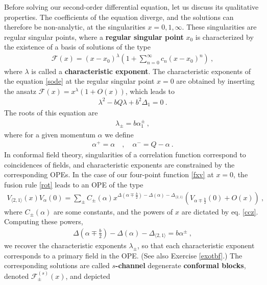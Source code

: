 \documentclass[12pt, a4paper, notitlepage, twoside]{report}
\numberwithin{equation}{section}
\theoremstyle{break}
\begin{document}
Before solving our second-order differential equation, let us discuss its qualitative properties.
The coefficients of the equation diverge, and the solutions can therefore be non-analytic, at the singularities $x=0,1,\infty$.
These singularities are regular singular points, where a \textbf{regular singular point} $x_0$ is characterized by the existence of a basis of solutions of the type  
\begin{align}
 \mathcal{F}(x)=(x-x_0)^\lambda\left(1+\sum_{n=0}^\infty c_n (x-x_0)^n\right)\ ,
\label{zxl}
\end{align}
where $\lambda$ is called a \textbf{\boldmath characteristic exponent}.
The characteristic exponents of the equation \eqref{sode} at the regular singular point $x=0$ are obtained by inserting the ansatz $\mathcal{F}(x) = x^\lambda(1+O(x))$, which leads to 
\begin{align}
 \lambda^2 - bQ\lambda + b^2 \Delta_1 = 0 \ .
\end{align}
The roots of this equation are 
\begin{align}
 \lambda_\pm = b\alpha_1^\pm \ , 
\label{lpm}
\end{align}
where for a given momentum $\alpha$ we define 
\begin{align}
 \alpha^+ = \alpha \quad , \quad \alpha^- = Q-\alpha\ .
\label{apm}
\end{align}
In conformal field theory, singularities of a correlation function correspond to coincidences of fields, and characteristic exponents are constrained by the corresponding OPEs.
In the case of our four-point function \eqref{fxv} at $x=0$, the fusion rule \eqref{rot} leads to an OPE of the type
\begin{align}
 V_{\langle 2,1 \rangle}(x)V_{\alpha}(0) = \sum_\pm C_\pm(\alpha) x^{\Delta\left(\alpha\mp \frac{b}{2}\right) -\Delta(\alpha) - \Delta_{\langle 2,1 \rangle}} \left(V_{\alpha\mp\frac{b}{2}}(0) + O(x)\right)\ ,
\end{align}
where $C_\pm(\alpha)$ are some constants, and the powers of $x$ are dictated by eq. \eqref{ccz}. 
Computing these powers,
\begin{align}
 \Delta\left(\alpha\mp \frac{b}{2}\right) -\Delta(\alpha) - \Delta_{\langle 2,1 \rangle}  = b \alpha^{\pm}\ ,
\end{align}
we recover the characteristic exponents $\lambda_\pm$, so that each characteristic exponent corresponds to a primary field in the OPE.
(See also Exercise \ref{exotbf}.) The corresponding solutions are called \textbf{\boldmath $s$-channel} degenerate \textbf{conformal blocks}, denoted $\mathcal{F}^{(s)}_\pm(x)$, and depicted
\end{document}
